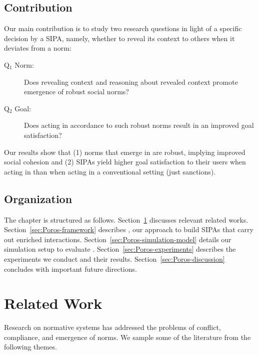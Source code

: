 \subsection{Contribution}
Our main contribution is to study two research questions in light of a specific decision by a SIPA, namely, whether to reveal its context to others when it deviates from a norm:

\begin{description}
\item[Q$_1$ Norm:] Does revealing context and reasoning about revealed context promote emergence of robust social norms? 
\item[Q$_2$ Goal:] Does acting in accordance to such robust norms result in an improved goal satisfaction?
\end{description}

Our results show that (1) norms that emerge in \frameworkB are robust, implying improved social cohesion and (2) SIPAs yield higher goal satisfaction to their users when acting in \frameworkB than when acting in a conventional setting (just sanctions). 

\subsection{Organization}
The chapter is structured as follows. 
Section~\ref{sec:Poros-related-work} discusses relevant related works.
Section~\ref{sec:Poros-framework} describes \frameworkB, our approach to build SIPAs that carry out enriched interactions.
Section~\ref{sec:Poros-simulation-model} details our simulation setup to evaluate \frameworkB. 
Section~\ref{sec:Poros-experiments} describes the experiments we conduct and their results. 
Section~\ref{sec:Poros-discussion} concludes with important future directions. 


\section{Related Work}
\label{sec:Poros-related-work}

Research on normative systems has addressed the problems of conflict, 
compliance, and emergence of norms. We sample some of the literature from the following themes.

